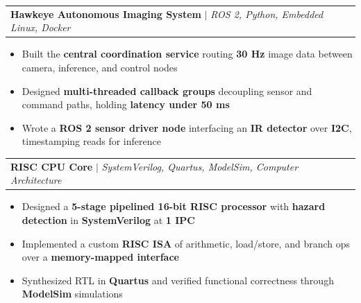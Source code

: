 \documentclass[letterpaper,11pt]{article}
\makeatletter
\newcommand{\resumeItem}[1]{
  \item\small{
    {#1 \vspace{-2pt}}
  }
}
\newcommand{\resumeProjectHeading}[2]{
    \item
    \begin{tabular*}{1.001\textwidth}{l@{\extracolsep{\fill}}r}
      \small#1 & \textbf{\small #2}\\
    \end{tabular*}\vspace{-7pt}
}
\newcommand{\resumeItemListStart}{\begin{itemize}}
\newcommand{\resumeItemListEnd}{\end{itemize}\vspace{-5pt}}
\makeatother
\begin{document}
%


\resumeProjectHeading
{\textbf{Hawkeye Autonomous Imaging System} $|$ \emph{ROS 2, Python, Embedded Linux, Docker}}{}
\resumeItemListStart
\resumeItem{Built the \textbf{central coordination service} routing \textbf{30 Hz} image data between camera, inference, and control nodes}
\resumeItem{Designed \textbf{multi-threaded callback groups} decoupling sensor and command paths, holding \textbf{latency under 50 ms}}
\resumeItem{Wrote a \textbf{ROS 2 sensor driver node} interfacing an \textbf{IR detector} over \textbf{I2C}, timestamping reads for inference}
\resumeItemListEnd


\vspace{-13pt}

\resumeProjectHeading
    {\textbf{RISC CPU Core} $|$ \emph{SystemVerilog, Quartus, ModelSim, Computer Architecture}}{}
    \resumeItemListStart
        \resumeItem{Designed a \textbf{5-stage pipelined 16-bit RISC processor} with \textbf{hazard detection} in \textbf{SystemVerilog} at \textbf{1 IPC}}
        \resumeItem{Implemented a custom \textbf{RISC ISA} of arithmetic, load/store, and branch ops over a \textbf{memory-mapped interface}}
        \resumeItem{Synthesized RTL in \textbf{Quartus} and verified functional correctness through \textbf{ModelSim} simulations}
    \resumeItemListEnd
\end{document}
